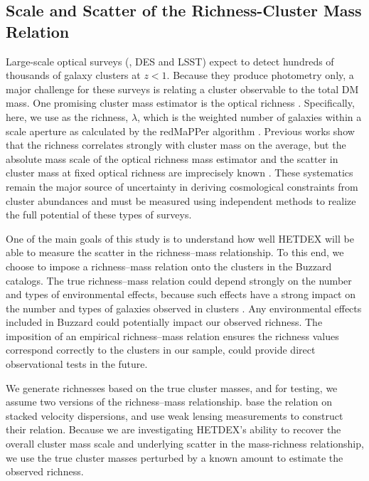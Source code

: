 \documentclass[fleqn,usenatbib]{mnras}
\begin{document}
\subsection{Scale and Scatter of the Richness-Cluster Mass Relation}
Large-scale optical surveys (\eg, DES and LSST) expect to detect hundreds of thousands of galaxy clusters at $z < 1$. Because they produce photometry only, a major challenge for these surveys is relating a cluster observable to the total DM mass. One promising cluster mass estimator is the optical richness . Specifically, here, we use as the richness, $\lambda$, which is the weighted number of galaxies within a scale aperture  as calculated by the redMaPPer algorithm \citep{Rykoff2012}. Previous works  show that the richness correlates strongly with cluster mass on the average, but the absolute mass scale of the optical richness mass estimator and the scatter in cluster mass at fixed optical richness are imprecisely known \citep{Rykoff2012}. These systematics remain the major source of uncertainty in deriving cosmological constraints from cluster abundances and must be measured using independent methods to realize the full potential of these types of surveys.

One of the main goals of this study is to understand how well HETDEX will be able to measure the scatter in the richness--mass relationship. To this end, we choose to impose a richness--mass relation onto the clusters in the Buzzard catalogs. The true richness--mass relation could depend strongly on the number and types of environmental effects, because such effects have a strong impact on the number and types of galaxies observed in clusters . Any environmental effects included in Buzzard could potentially impact our observed richness. The imposition of an empirical richness--mass relation ensures the richness values correspond correctly to the clusters in our sample, could provide direct observational tests in the future.

We generate richnesses based on the true cluster masses, and for testing, we assume two versions of the richness--mass relationship. \cite{Farahi2016} base the relation on stacked velocity dispersions, and \cite{Simet2016} use weak lensing measurements to construct their relation. Because we are investigating HETDEX's ability to recover the overall cluster mass scale and underlying scatter in the mass-richness relationship, we use the true cluster masses perturbed by a known amount to estimate the observed richness. 
\end{document}
